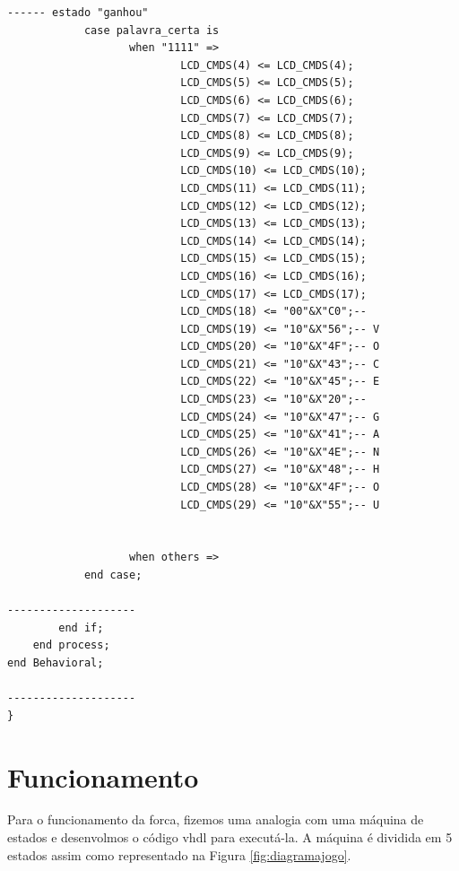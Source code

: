 \documentclass[a4paper,12pt,twoside]{article}
\begin{document}
\begin{lstlisting}
------ estado "ganhou"  	
            case palavra_certa is
                   when "1111" =>
                           LCD_CMDS(4) <= LCD_CMDS(4);  
                           LCD_CMDS(5) <= LCD_CMDS(5);  
                           LCD_CMDS(6) <= LCD_CMDS(6); 	
                           LCD_CMDS(7) <= LCD_CMDS(7);  
                           LCD_CMDS(8) <= LCD_CMDS(8);  
                           LCD_CMDS(9) <= LCD_CMDS(9);  
                           LCD_CMDS(10) <= LCD_CMDS(10);  
                           LCD_CMDS(11) <= LCD_CMDS(11); 
                           LCD_CMDS(12) <= LCD_CMDS(12); 
                           LCD_CMDS(13) <= LCD_CMDS(13); 
                           LCD_CMDS(14) <= LCD_CMDS(14); 
                           LCD_CMDS(15) <= LCD_CMDS(15); 
                           LCD_CMDS(16) <= LCD_CMDS(16); 
                           LCD_CMDS(17) <= LCD_CMDS(17); 
                           LCD_CMDS(18) <= "00"&X"C0";-- 
                           LCD_CMDS(19) <= "10"&X"56";-- V
                           LCD_CMDS(20) <= "10"&X"4F";-- O
                           LCD_CMDS(21) <= "10"&X"43";-- C
                           LCD_CMDS(22) <= "10"&X"45";-- E
                           LCD_CMDS(23) <= "10"&X"20";-- 
                           LCD_CMDS(24) <= "10"&X"47";-- G
                           LCD_CMDS(25) <= "10"&X"41";-- A 
                           LCD_CMDS(26) <= "10"&X"4E";-- N
                           LCD_CMDS(27) <= "10"&X"48";-- H
                           LCD_CMDS(28) <= "10"&X"4F";-- O
                           LCD_CMDS(29) <= "10"&X"55";-- U
    
    
                   when others =>
            end case;

--------------------
		end if;
	end process;					
end Behavioral;

--------------------
} \end{lstlisting}

\section{Funcionamento}

Para o funcionamento da forca, fizemos uma analogia com uma máquina de estados e desenvolmos o código vhdl para executá-la. A máquina é dividida em 5 estados assim como representado na Figura \ref{fig:diagramajogo}.
\end{document}
